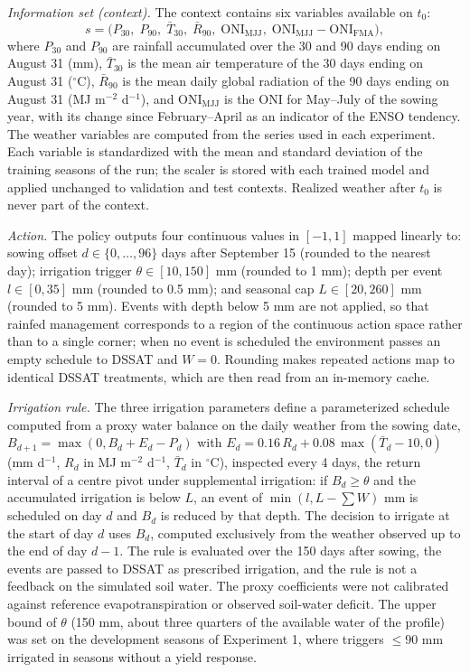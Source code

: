 \documentclass[times,final,authoryear]{elsarticle}
\begin{document}
\emph{Information set (context).} The context contains six variables available on $t_0$:
\begin{equation}
s = \big(P_{30},\; P_{90},\; \bar{T}_{30},\; \bar{R}_{90},\; \mathrm{ONI}_{\mathrm{MJJ}},\; \mathrm{ONI}_{\mathrm{MJJ}}-\mathrm{ONI}_{\mathrm{FMA}}\big),
\label{eq_context}
\end{equation}
where $P_{30}$ and $P_{90}$ are rainfall accumulated over the 30 and 90 days ending on August 31 (mm), $\bar{T}_{30}$ is the mean air temperature of the 30 days ending on August 31 ($^{\circ}$C), $\bar{R}_{90}$ is the mean daily global radiation of the 90 days ending on August 31 (MJ m$^{-2}$ d$^{-1}$), and $\mathrm{ONI}_{\mathrm{MJJ}}$ is the ONI for May--July of the sowing year, with its change since February--April as an indicator of the ENSO tendency. The weather variables are computed from the series used in each experiment. Each variable is standardized with the mean and standard deviation of the training seasons of the run; the scaler is stored with each trained model and applied unchanged to validation and test contexts. Realized weather after $t_0$ is never part of the context.

\emph{Action.} The policy outputs four continuous values in $[-1,1]$ mapped linearly to: sowing offset $d \in \{0,\dots,96\}$ days after September 15 (rounded to the nearest day); irrigation trigger $\theta \in [10, 150]$ mm (rounded to 1 mm); depth per event $l \in [0, 35]$ mm (rounded to 0.5 mm); and seasonal cap $L \in [20, 260]$ mm (rounded to 5 mm). Events with depth below 5 mm are not applied, so that rainfed management corresponds to a region of the continuous action space rather than to a single corner; when no event is scheduled the environment passes an empty schedule to DSSAT and $W = 0$. Rounding makes repeated actions map to identical DSSAT treatments, which are then read from an in-memory cache.

\emph{Irrigation rule.} The three irrigation parameters define a parameterized schedule computed from a proxy water balance on the daily weather from the sowing date, $B_{d+1} = \max(0, B_d + E_d - P_d)$ with $E_d = 0.16\,R_d + 0.08\,\max(\bar{T}_d - 10, 0)$ (mm d$^{-1}$, $R_d$ in MJ m$^{-2}$ d$^{-1}$, $\bar{T}_d$ in $^{\circ}$C), inspected every 4 days, the return interval of a centre pivot under supplemental irrigation: if $B_d \geq \theta$ and the accumulated irrigation is below $L$, an event of $\min(l, L - \sum W)$ mm is scheduled on day $d$ and $B_d$ is reduced by that depth. The decision to irrigate at the start of day $d$ uses $B_d$, computed exclusively from the weather observed up to the end of day $d-1$. The rule is evaluated over the 150 days after sowing, the events are passed to DSSAT as prescribed irrigation, and the rule is not a feedback on the simulated soil water. The proxy coefficients were not calibrated against reference evapotranspiration or observed soil-water deficit. The upper bound of $\theta$ (150 mm, about three quarters of the available water of the profile) was set on the development seasons of Experiment 1, where triggers $\leq 90$ mm irrigated in seasons without a yield response.
\end{document}

